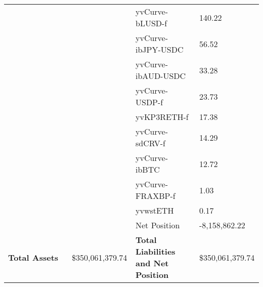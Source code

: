 \begin{longtable}{@{}p{0.25\linewidth}p{0.25\linewidth}p{0.25\linewidth}p{0.25\linewidth}@{}}
 &  & yvCurve-bLUSD-f & 140.22 \\
 &  & yvCurve-ibJPY-USDC & 56.52 \\
 &  & yvCurve-ibAUD-USDC & 33.28 \\
 &  & yvCurve-USDP-f & 23.73 \\
 &  & yvKP3RETH-f & 17.38 \\
 &  & yvCurve-sdCRV-f & 14.29 \\
 &  & yvCurve-ibBTC & 12.72 \\
 &  & yvCurve-FRAXBP-f & 1.03 \\
 &  & yvwstETH & 0.17 \\
 &  & Net Position & -8,158,862.22 \\

\midrule

\textbf{Total Assets} & \$350,061,379.74 & \textbf{Total Liabilities and Net Position} & \$350,061,379.74 \\

\bottomrule

\end{longtable}
